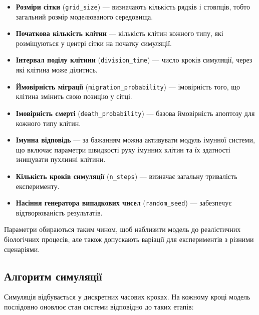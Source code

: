 \documentclass{article}
\begin{document}
\begin{itemize}
  \item \textbf{Розміри сітки} (\texttt{grid\_size}) --- визначають кількість рядків і стовпців, тобто загальний розмір моделюваного середовища.
  \item \textbf{Початкова кількість клітин} --- кількість клітин кожного типу, які розміщуються у центрі сітки на початку симуляції.
  \item \textbf{Інтервал поділу клітини} (\texttt{division\_time}) --- число кроків симуляції, через які клітина може ділитись.
  \item \textbf{Ймовірність міграції} (\texttt{migration\_probability}) --- імовірність того, що клітина змінить свою позицію у сітці.
  \item \textbf{Імовірність смерті} (\texttt{death\_probability}) --- базова ймовірність апоптозу для кожного типу клітин.
  \item \textbf{Імунна відповідь} --- за бажанням можна активувати модуль імунної системи, що включає параметри швидкості руху імунних клітин та їх здатності знищувати пухлинні клітини.
  \item \textbf{Кількість кроків симуляції} (\texttt{n\_steps}) --- визначає загальну тривалість експерименту.
  \item \textbf{Насіння генератора випадкових чисел} (\texttt{random\_seed}) --- забезпечує відтворюваність результатів.
\end{itemize}

Параметри обираються таким чином, щоб наблизити модель до реалістичних біологічних процесів, але також допускають варіації для експериментів з різними сценаріями.

\subsection{Алгоритм симуляції}

Симуляція відбувається у дискретних часових кроках. На кожному кроці модель послідовно оновлює стан системи відповідно до таких етапів:
\end{document}
